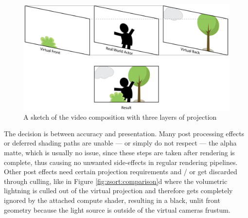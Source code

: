 \begin{figure}[htb]
	\includegraphics[width=\textwidth]{gfx/tri-graph.png}
	\caption{A sketch of the video composition with three layers of projection}
	\label{fig:zsort:sketch}
\end{figure}

The decision is between accuracy and presentation. Many post processing effects 
or deferred shading paths are unable --- or simply do not respect --- the 
alpha matte, which is usually no issue, since these steps are taken after 
rendering is complete, thus causing no unwanted side-effects in regular 
rendering pipelines. Other post effects need certain projection requirements 
and / or get discarded through culling, like in Figure 
\ref{fig:zsort:comparison}d where the volumetric lightning is culled out of the 
virtual projection and therefore gets completely ignored by the attached 
compute shader, resulting in a black, unlit front geometry because the light 
source is outside of the virtual cameras frustum.

